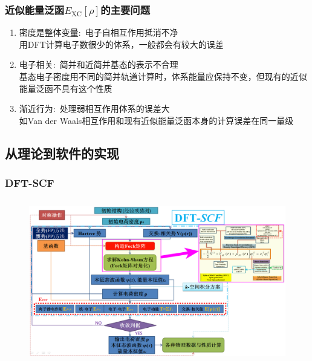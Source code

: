 \frame                               %
{
	\frametitle{近似能量泛函$E_{\mathrm{XC}}[\rho]$的主要问题}
\vskip 20pt
\begin{enumerate}%
   \setlength{\itemsep}{10pt}
 \item  密度是整体变量:~电子自相互作用抵消不净\\%
	 用\textrm{DFT}计算电子数很少的体系，一般都会有较大的误差
 \item  电子相关:~简并和近简并基态的表示不合理\\
	 基态电子密度用不同的简并轨道计算时，体系能量应保持不变，但现有的近似能量泛函不具有这个性质
 \item  渐近行为:~处理弱相互作用体系的误差大\\
	 如\textrm{Van der Waals}相互作用和现有近似能量泛函本身的计算误差在同一量级
 \end{enumerate}
}

\subsection{从理论到软件的实现}
\frame
{
	\frametitle{\textrm{DFT-SCF}}
\begin{figure}[h!]
\centering
\vspace*{-0.25in}
\hspace*{-0.80in}
\includegraphics[height=2.80in,width=4.95in,viewport=5 3 1490 870,clip]{Figures/DFT-SCF_2.png}
\label{DFT-SCF-2}
\end{figure}
}

